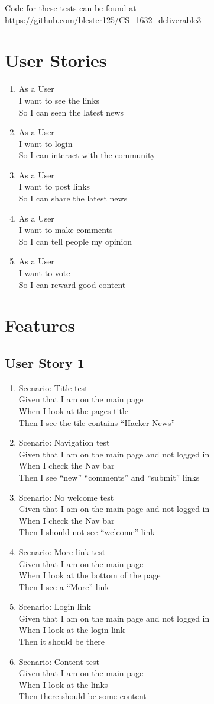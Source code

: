 \documentclass[titlepage]{article}
\newcommand{\story}[3]{As a {#1}\\
I want {#2}\\
So {#3}\\
}
\newcommand{\feature}[4]{Scenario: {#1}\\
Given {#2}\\
When {#3}\\
Then {#4}\\
}
\begin{document}
Code for these tests can be found at \\
https://github.com/blester125/CS\_1632\_deliverable3

\newpage
\section{User Stories}
\begin{enumerate}
\item \story{User}{to see the links}{I can seen the latest news}
\item \story{User}{to login}{I can interact with the community}
\item \story{User}{to post links}{I can share the latest news}
\item \story{User}{to make comments}{I can tell people my opinion}
\item \story{User}{to vote}{I can reward good content}
\end{enumerate}
\newpage
\section{Features}
\subsection{User Story 1}
\begin{enumerate}
\item
\feature
{Title test}
{that I am on the main page}
{I look at the pages title}
{I see the tile contains ``Hacker News''}
\item
\feature
{Navigation test}
{that I am on the main page and not logged in}
{I check the Nav bar}
{I see ``new'' ``comments'' and ``submit'' links}
\item
\feature
{No welcome test}
{that I am on the main page and not logged in}
{I check the Nav bar}
{I should not see ``welcome'' link}
\item
\feature
{More link test}
{that I am on the main page}
{I look at the bottom of the page}
{I see a ``More'' link}
\item
\feature
{Login link}
{that I am on the main page and not logged in}
{I look at the login link}
{it should be there}
\item
\feature
{Content test}
{that I am on the main page}
{I look at the links}
{there should be some content}
\end{enumerate}
\end{document}
